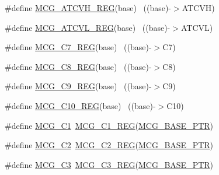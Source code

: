 \begin{DoxyCompactItemize}
\item 
\#define \hyperlink{group___m_c_g___register___accessor___macros_gad874adcb4ac61be011c975d1e0441273}{M\+C\+G\+\_\+\+A\+T\+C\+V\+H\+\_\+\+R\+EG}(base)                                        ~((base)-\/$>$A\+T\+C\+VH)
\item 
\#define \hyperlink{group___m_c_g___register___accessor___macros_ga474ad360067826ccee78bcec3713b1d2}{M\+C\+G\+\_\+\+A\+T\+C\+V\+L\+\_\+\+R\+EG}(base)                                        ~((base)-\/$>$A\+T\+C\+VL)
\item 
\#define \hyperlink{group___m_c_g___register___accessor___macros_ga305ccd258608317dc3800156b312ff65}{M\+C\+G\+\_\+\+C7\+\_\+\+R\+EG}(base)                                              ~((base)-\/$>$C7)
\item 
\#define \hyperlink{group___m_c_g___register___accessor___macros_gabd2e261bd5f2bddbbed7e076eaf90dee}{M\+C\+G\+\_\+\+C8\+\_\+\+R\+EG}(base)                                              ~((base)-\/$>$C8)
\item 
\#define \hyperlink{group___m_c_g___register___accessor___macros_ga39eb9908ab90f92f6fb8a38a3257734c}{M\+C\+G\+\_\+\+C9\+\_\+\+R\+EG}(base)                                              ~((base)-\/$>$C9)
\item 
\#define \hyperlink{group___m_c_g___register___accessor___macros_gac02ecb9de294f19f1290b9d6863cce3c}{M\+C\+G\+\_\+\+C10\+\_\+\+R\+EG}(base)                                            ~((base)-\/$>$C10)
\item 
\#define \hyperlink{group___m_c_g___register___accessor___macros_ga3f1a2c81a59d97251a06534341ad3303}{M\+C\+G\+\_\+\+C1}~\hyperlink{group___m_c_g___register___accessor___macros_gae34b03d76caea16a8366fb11838560ea}{M\+C\+G\+\_\+\+C1\+\_\+\+R\+EG}(\hyperlink{group___m_c_g___peripheral_gaceefc72e93a47a35f59a31c57dddf41b}{M\+C\+G\+\_\+\+B\+A\+S\+E\+\_\+\+P\+TR})
\item 
\#define \hyperlink{group___m_c_g___register___accessor___macros_gabaeaf7dd44e609a83f01b9fec0dec0c3}{M\+C\+G\+\_\+\+C2}~\hyperlink{group___m_c_g___register___accessor___macros_ga81f0c07fe9169d8b0d87c8dc497b4732}{M\+C\+G\+\_\+\+C2\+\_\+\+R\+EG}(\hyperlink{group___m_c_g___peripheral_gaceefc72e93a47a35f59a31c57dddf41b}{M\+C\+G\+\_\+\+B\+A\+S\+E\+\_\+\+P\+TR})
\item 
\#define \hyperlink{group___m_c_g___register___accessor___macros_gaea76a22acf5112243d988d5d73c5a459}{M\+C\+G\+\_\+\+C3}~\hyperlink{group___m_c_g___register___accessor___macros_ga0a47f442b7ba0665e9536b8d187c2f92}{M\+C\+G\+\_\+\+C3\+\_\+\+R\+EG}(\hyperlink{group___m_c_g___peripheral_gaceefc72e93a47a35f59a31c57dddf41b}{M\+C\+G\+\_\+\+B\+A\+S\+E\+\_\+\+P\+TR})

\end{DoxyCompactItemize}
